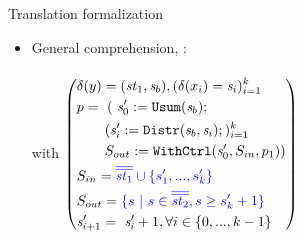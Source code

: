 \documentclass{beamer}
\begin{document}
%



\begin{frame}{Translation formalization}
\begin{itemize} 
	\item General comprehension, 
	 : \\[2ex]

{\small 
		\\[2ex]
  with $\left(
  	\begin{aligned}	
  	& \delta(y) = (\mathit{st}_1,\mathit{s}_b), (\delta(x_i) = \mathit{s}_i)^k_{i=1}	\\		
  	& p =  \ (\ \mathit{s}'_0 := \mathtt{Usum}(\mathit{s}_b); \\
  	& \qquad (\mathit{s}'_i := \mathtt{Distr}(\mathit{s}_b,\mathit{s}_i);)^k_{i=1} \\
  	& \qquad S_{out} := \mathtt{WithCtrl}(\mathit{s}'_0,S_{in},p_1)) \\
  	&S_{in} = {\color{blue} \overline{\overline{\mathit{st}_1}} \cup \{s'_1,...,s'_k\}} \\ 
  	& S_{out} = {\color{blue} \{s \ | \  s \in \overline{\overline{\mathit{st}_2}}, s \ge s'_k+1 \}} \\
  	&\mathit{s}'_{i+1} =  \ \mathit{s}'_i + 1, \forall i \in \{0,...,k-1\} \\
  \end{aligned}
  \right)$
}  
% 	
% 		
% 	
	

\end{itemize}
\end{frame}
\end{document}
